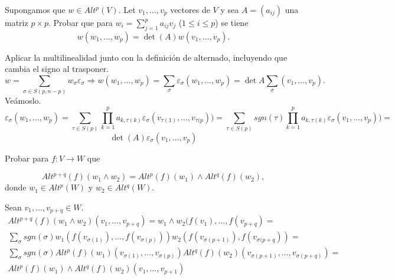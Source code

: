 \documentclass[twoside]{article}
\begin{document}
\newpage

\begin{ejercicio}{2.6}
Supongamos que $w\in Alt^p(V)$. Let $v_1,\dots, v_p$ vectores de $V$ y sea $A=(a_{ij})$ una matriz $p\times p$. Probar que para $w_i=\sum_{j=1}^pa_{ij}v_j$ ($1\leq i\leq p$) se tiene
$$w(w_1,\dots, w_p)=\det(A)w(v_1,\dots, v_p).$$
\end{ejercicio}
\begin{solucion}
Aplicar la multilinealidad junto con la definición de alternado, incluyendo que cambia el signo al trasponer.
\[
w=\sum_{\sigma\in S(p,n-p)} w_{\sigma}\varepsilon_{\sigma}\Rightarrow w(w_1,\dots, w_p)=\sum_{\sigma}\varepsilon_{\sigma}(w_1,\dots, w_p)=\det A\sum_{\sigma}(v_1,\dots, v_p). 
\]
Veámoslo.
\[
\varepsilon_{\sigma}(w_1,\dots, w_p)=\sum_{\tau\in S(p)}\prod_{k=1}^p a_{k,\tau(k)} \varepsilon_{\sigma}(v_{\tau(1)},\dots, v_{\tau(p}))=\sum_{\tau\in S(p)}sgn(\tau)\prod_{k=1}^p a_{k,\tau(k)} \varepsilon_{\sigma} (v_{1},\dots, v_{p}))=
\]
\[
\det(A)\varepsilon_{\sigma}(v_1,\dots, v_p)
\]
\end{solucion}

\newpage

\begin{ejercicio}{2.7}
Probar para $f:V\to W$ que

$$Alt^{p+q}(f)(w_1\land w_2)=Alt^p(f)(w_1)\land Alt^q(f)(w_2),$$
donde $w_1\in Alt^p(W)$ y $w_2\in Alt^q(W)$.
\end{ejercicio}
\begin{solucion}
Sean $v_1,\dots, v_{p+q}\in W$. 
\begin{gather*}
Alt^{p+q}(f)(w_1\land w_2)(v_1,\dots, v_{p+q})=w_1\land w_2(f(v_1),\dots, f(v_{p+q})=\\
\sum_{\sigma}sgn(\sigma)w_1(f(v_{\sigma(1)}),\dots, f(v_{\sigma(p)}))w_2(f(v_{\sigma(p+1)}),f(v_{\sigma(p+q}))=\\
\sum_{\sigma}sgn(\sigma) Alt^p(f)(w_1)(v_{\sigma(1)},\dots, v_{\sigma(p)})Alt^q(f)(w_2)(v_{\sigma(p+1)},\dots, v_{\sigma(p+q)})=\\
Alt^p(f)(w_1)\land Alt^q(f)(w_2)(v_1,\dots, v_{p+1})
\end{gather*}
\end{solucion}
\end{document}
